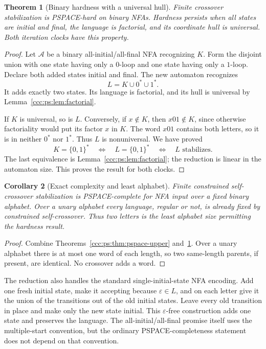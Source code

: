\documentclass[11pt,letterpaper]{article}
\newtheorem{theorem}{Theorem}[section]
\newtheorem{corollary}[theorem]{Corollary}
\theoremstyle{definition}
\theoremstyle{remark}
\newcommand{\eps}{\varepsilon}
\begin{document}
\begin{theorem}[Binary hardness with a universal hull]\label{ccc:ps:thm:hardness}
Finite crossover stabilization is PSPACE-hard on binary NFAs. Hardness
persists when all states are initial and final, the language is factorial,
and its coordinate hull is universal. Both iteration clocks have this
property.
\end{theorem}
\begin{proof}
Let $\mathcal A$ be a binary all-initial/all-final NFA recognizing $K$.
Form the disjoint union with one state having only a $0$-loop and one state
having only a $1$-loop. Declare both added states initial and final. The
new automaton recognizes
\begin{equation}\label{ccc:ps:eq:binary-reduction}
 L=K\cup0^*\cup1^*.
\end{equation}
It adds exactly two states. Its language is factorial, and its hull is
universal by Lemma~\ref{ccc:ps:lem:factorial}.

If $K$ is universal, so is $L$. Conversely, if $x\notin K$, then
$x01\notin K$, since otherwise factoriality would put its factor $x$
in $K$. The word $x01$ contains both letters, so it is in neither
$0^*$ nor $1^*$. Thus $L$ is nonuniversal. We have proved
\[
 K=\{0,1\}^*\quad\Longleftrightarrow\quad
 L=\{0,1\}^*\quad\Longleftrightarrow\quad
 L\text{ stabilizes}.
\]
The last equivalence is Lemma~\ref{ccc:ps:lem:factorial}; the reduction is linear
in the automaton size. This proves the result for both clocks.
\end{proof}

\begin{corollary}[Exact complexity and least alphabet]\label{ccc:ps:cor:binary-complete}
Finite constrained self-crossover stabilization is PSPACE-complete for
NFA input over a fixed binary alphabet. Over a unary alphabet every
language, regular or not, is already fixed by constrained self-crossover.
Thus two letters is the least alphabet size permitting the hardness result.
\end{corollary}
\begin{proof}
Combine Theorems~\ref{ccc:ps:thm:pspace-upper} and~\ref{ccc:ps:thm:hardness}.
Over a unary alphabet there is at most one word of each length, so two
same-length parents, if present, are identical. No crossover adds a word.
\end{proof}

The reduction also handles the standard single-initial-state NFA encoding.
Add one fresh initial state, make it accepting because $\eps\in L$, and
on each letter give it the union of the transitions out of the old initial
states. Leave every old transition in place and make only the new state
initial. This $\eps$-free construction adds one state and preserves the
language. The all-initial/all-final promise itself uses the multiple-start
convention, but the ordinary PSPACE-completeness statement does not depend
on that convention.
\end{document}
